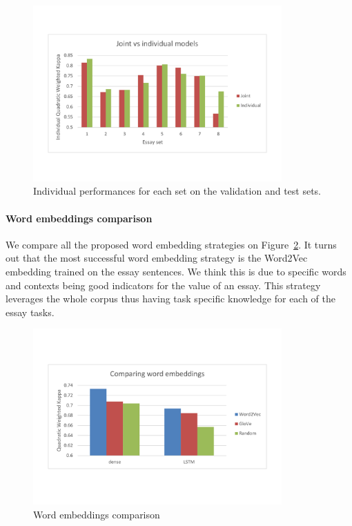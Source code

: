 \documentclass[a4paper,12pt,english]{article}
\begin{document}
\begin{figure}
\centering
\vspace*{-1.5cm}
\includegraphics[width=0.85\textwidth]{fig/joint_vs_indiv.pdf}
\vspace*{-1.5cm}
\caption{Individual performances for each set on the validation and test sets.}
\label{fig:individualperf}
\end{figure}

\paragraph{Word embeddings comparison} We compare all the proposed word embedding strategies on Figure~\ref{fig:embeddings}. It turns out that the most successful word embedding strategy is the Word2Vec embedding trained on the essay sentences. We think this is due to specific words and contexts being good indicators for the value of an essay. This strategy leverages the whole corpus thus having task specific knowledge for each of the essay tasks.

\begin{figure}
\vspace*{-1.5cm}
\centering
\includegraphics[width=0.85\textwidth]{fig/word_embeddings.pdf}
\vspace*{-1cm}
\caption{Word embeddings comparison}
\label{fig:embeddings}
\end{figure}
\end{document}
